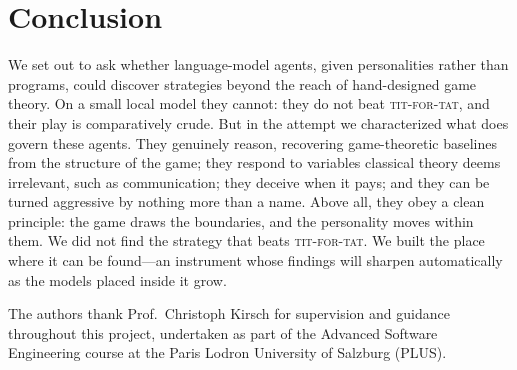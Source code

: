 \section{Conclusion}
\label{sec:conclusion}

We set out to ask whether language-model agents, given personalities rather than programs, could discover strategies beyond the reach of hand-designed game theory. On a small local model they cannot: they do not beat \textsc{tit-for-tat}, and their play is comparatively crude. But in the attempt we characterized what does govern these agents. They genuinely reason, recovering game-theoretic baselines from the structure of the game; they respond to variables classical theory deems irrelevant, such as communication; they deceive when it pays; and they can be turned aggressive by nothing more than a name. Above all, they obey a clean principle: the game draws the boundaries, and the personality moves within them. We did not find the strategy that beats \textsc{tit-for-tat}. We built the place where it can be found---an instrument whose findings will sharpen automatically as the models placed inside it grow.

\begin{acks}
The authors thank Prof.\ Christoph Kirsch for supervision and guidance throughout this project, undertaken as part of the Advanced Software Engineering course at the Paris Lodron University of Salzburg (PLUS).
\end{acks}





